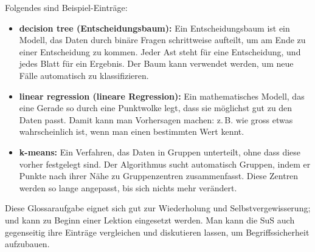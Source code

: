 \begin{aufgabe}{6} Folgendes sind Beispiel-Einträge:

\begin{itemize}
  \item \textbf{decision tree (Entscheidungsbaum):}  
  Ein Entscheidungsbaum ist ein Modell, das Daten durch binäre Fragen schrittweise aufteilt, um am Ende zu einer Entscheidung zu kommen. Jeder Ast steht für eine Entscheidung, und jedes Blatt für ein Ergebnis. Der Baum kann verwendet werden, um neue Fälle automatisch zu klassifizieren.

  \item \textbf{linear regression (lineare Regression):}  
  Ein mathematisches Modell, das eine Gerade so durch eine Punktwolke legt, dass sie möglichst gut zu den Daten passt. Damit kann man Vorhersagen machen: z. B. wie gross etwas wahrscheinlich ist, wenn man einen bestimmten Wert kennt.

  \item \textbf{k-means:}  
  Ein Verfahren, das Daten in Gruppen unterteilt, ohne dass diese vorher festgelegt sind. Der Algorithmus sucht automatisch Gruppen, indem er Punkte nach ihrer Nähe zu Gruppenzentren zusammenfasst. Diese Zentren werden so lange angepasst, bis sich nichts mehr verändert.
\end{itemize}

\end{aufgabe}

Diese Glossaraufgabe eignet sich gut zur Wiederholung und Selbstvergewisserung; und kann zu Beginn einer Lektion eingesetzt werden. Man kann die SuS auch gegenseitig ihre Einträge vergleichen und diskutieren lassen, um Begriffssicherheit aufzubauen.
